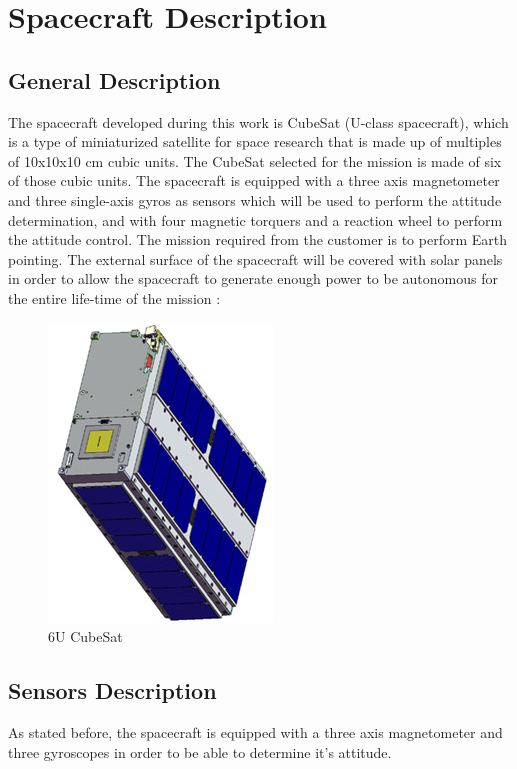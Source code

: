 \documentclass[11pt,a4paper]{report}
\begin{document}
\chapter{Spacecraft Description}

\section{General Description} \label{sec:general}
The spacecraft developed during this work is CubeSat (U-class spacecraft), which is a type of miniaturized satellite for space research that is made up of multiples of 10x10x10 cm cubic units. The CubeSat selected for the mission is made of six of those cubic units.
The spacecraft is equipped with a three axis magnetometer and three single-axis gyros as sensors which will be used to perform the attitude determination, and with four magnetic torquers and a reaction wheel to perform the attitude control.
The mission required from the customer is to perform Earth pointing.
The external surface of the spacecraft will be covered with solar panels in order to allow the spacecraft to generate enough power to be autonomous for the entire life-time of the mission : 

\begin{figure}[H]
 	\centering
 	\includegraphics[scale=0.4]{gfx/cubesat_panels.jpg}
    \caption{6U CubeSat}
\end{figure}

\section{Sensors Description}
As stated before, the spacecraft is equipped with a three axis magnetometer and three gyroscopes in order to be able to determine it's attitude.
\end{document}
